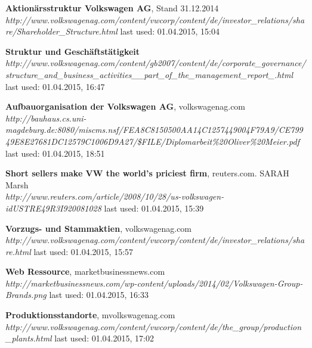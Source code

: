 \documentclass[12pt]{article}
\begin{document}
\begin{thebibliography}{56}
    
  \textbf{Aktionärsstruktur Volkswagen AG}, Stand 31.12.2014 \\
  \textit{http://www.volkswagenag.com/content/vwcorp/content/de/investor\_relations/share/Shareholder\_Structure.html}
  \newline last used: 01.04.2015, 15:04
    
  \textbf{Struktur und Geschäftstätigkeit}\\
  \textit{http://www.volkswagenag.com/content/gb2007/content/de/corporate\_governance/structure\_and\_business\_activities\_\_part\_of\_the\_management\_report\_.html}
  \newline last used: 01.04.2015, 16:47
  
  \textbf{Aufbauorganisation der Volkswagen AG}, volkswagenag.com \\
  \textit{http://bauhaus.cs.uni-magdeburg.de:8080/miscms.nsf/FEA8C8150500AA14C1257449004F79A9/CE79949E8E27681DC12579C1006D9A27/\$FILE/Diplomarbeit\%20Oliver\%20Meier.pdf}
  \newline last used: 01.04.2015, 18:51  
  
 \textbf{Short sellers make VW the world's priciest firm}, reuters.com. SARAH Marsh \\
  \textit{  http://www.reuters.com/article/2008/10/28/us-volkswagen-idUSTRE49R3I920081028}
  \newline last used: 01.04.2015, 15:39  
  
 \textbf{Vorzugs- und Stammaktien}, volkswagenag.com \\
  \textit{   http://www.volkswagenag.com/content/vwcorp/content/de/investor\_relations/share.html}
  \newline last used: 01.04.2015, 15:57
  
 \textbf{Web Ressource}, marketbusinessnews.com \\
  \textit{   http://marketbusinessnews.com/wp-content/uploads/2014/02/Volkswagen-Group-Brands.png}
  \newline last used: 01.04.2015, 16:33
  
 \textbf{Produktionsstandorte}, mvolkswagenag.com \\
  \textit{   http://www.volkswagenag.com/content/vwcorp/content/de/the\_group/production\_plants.html}
  \newline last used: 01.04.2015, 17:02
  

\end{thebibliography}
\end{document}
